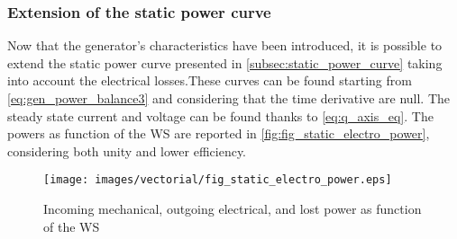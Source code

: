  \subsubsection{Extension of the static power curve}\label{subsec:genertaor_power_curve}
 Now that the generator's characteristics have been introduced, it is possible to extend the static power curve presented in \autoref{subsec:static_power_curve} taking into account the electrical losses.These curves can be found starting from \autoref{eq:gen_power_balance3} and considering that the time derivative are null. The steady state current and voltage can be found thanks to \autoref{eq:q_axis_eq}. The powers as function of the \acrshort{WS} are reported in \autoref{fig:fig_static_electro_power}, considering both unity and lower efficiency.
\begin{figure}[htb]
  \centering
  \texttt{[image: images/vectorial/fig\_static\_electro\_power.eps]}
  \caption{Incoming mechanical, outgoing electrical, and lost power as function of the WS}
  \label{fig:fig_static_electro_power}
\end{figure}

 